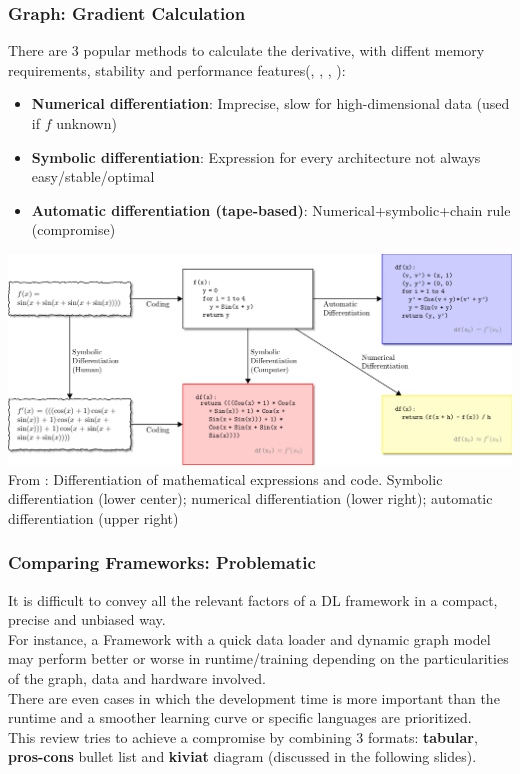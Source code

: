 \documentclass[hyperref={pdfpagelabels=false}]{beamer}
\begin{document}
     \begin{frame}
       \frametitle{Graph: Gradient Calculation}
       \small{There are 3 popular methods to calculate the derivative, with diffent memory requirements, stability and performance features(\cite{bart-review}, \cite{dali-autodiff}, \cite{domluna-autodiff}, \cite{domke-autodiff})}:
       \begin{itemize}
       \item \scriptsize{\textbf{Numerical differentiation}: Imprecise, slow for high-dimensional data (used if $f$ unknown)}
       \item \scriptsize{\textbf{Symbolic differentiation}: Expression for every architecture not always easy/stable/optimal}
       \item \scriptsize{\textbf{Automatic differentiation (tape-based)}: Numerical+symbolic+chain rule (compromise)}
       \end{itemize}
       \vspace{-3mm}
       \begin{center}
         \includegraphics[scale=0.24]{autodiff_pic.png}
         \tiny{\\From \cite{autodiff-paper}: Differentiation of mathematical expressions and code. Symbolic differentiation (lower center); numerical differentiation (lower right); automatic differentiation (upper right)}
       \end{center}
     \end{frame}
     
     \begin{frame}
       \frametitle{Comparing Frameworks: Problematic}

       It is difficult to convey all the relevant factors of a DL framework in a compact, precise and unbiased way.\\[10pt]

       For instance, a Framework with a quick data loader and dynamic graph model may perform better or worse in runtime/training depending on the particularities of the graph, data and hardware involved.\\[10pt]

       There are even cases in which the development time is more important than the runtime and a smoother learning curve or specific languages are prioritized.\\[10pt]

       This review tries to achieve a compromise by combining 3 formats: \textbf{tabular}, \textbf{pros-cons} bullet list and \textbf{kiviat} diagram (discussed in the following slides).

     \end{frame}
\end{document}
